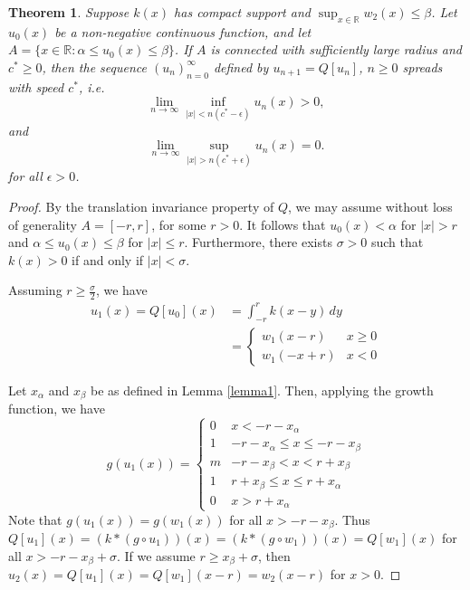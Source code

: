\documentclass[11pt]{article}
\newtheorem{thm}{Theorem}
\theoremstyle{definition}
\numberwithin{equation}{section}
\numberwithin{thm}{section}
\renewcommand{\a}{\alpha}
\renewcommand{\b}{\beta}
\begin{document}
\begin{thm} Suppose $k(x)$ has compact support and $\sup_{x\in\mathbb R}w_2(x)\leq \b$. Let $u_0(x)$ be a non-negative continuous function, and let $A=\{x\in\mathbb R:\a\leq u_0(x)\leq \b\}$. If $A$ is connected with sufficiently large radius and $c^* \geq 0$, then the sequence $(u_n)_{n=0}^{\infty}$ defined by $u_{n+1}=Q[u_n]$, $n\geq 0$ spreads with speed $c^*$, i.e.
\begin{equation}
\lim_{n\to\infty}\inf_{|x|<n(c^*-\epsilon)}u_{n}(x)>0,
\end{equation}
and 
\begin{equation}
\lim_{n\to\infty}\sup_{|x|>n(c^*+\epsilon)}u_n(x)=0.
\end{equation}
for all $\epsilon>0$.
\end{thm}

\begin{proof}
By the translation invariance property of $Q$, we may assume without loss of generality $A=[-r,r]$, for some $r>0$. It follows that $u_0(x)<\a$ for $|x|>r$ and $\a\leq u_0(x)\leq\b$ for $|x| \leq r$. Furthermore, there exists $\sigma>0$ such that $k(x)>0$ if and only if $|x|<\sigma$.

Assuming $r \geq \frac{\sigma}{2}$, we have
\begin{equation} \begin{aligned}
u_1(x) = Q[u_0](x) &= \int_{-r}^{r} k(x-y) \, dy \\
&= \begin{cases}
w_1(x-r) & x \geq 0 \\
w_1(-x+r) & x< 0
\end{cases}
\end{aligned}  \end{equation}

Let $x_\a$ and $x_\b$ be as defined in Lemma \ref{lemma1}. Then, applying the growth function, we have
\begin{equation} g(u_1(x)) = \begin{cases}
0 & x<-r-x_\a \\
1 & -r-x_\a \leq x \leq -r-x_\b \\
m & -r-x_\b < x < r+x_\b \\
1 & r+x_\b \leq x \leq r+x_\a \\
0 & x > r+x_\a
\end{cases}
\end{equation}
Note that $g(u_1(x))=g(w_1(x))$ for all $x >-r-x_\b$. Thus $Q[u_1](x)=(k*(g\circ u_1))(x)=(k*(g\circ w_1))(x)=Q[w_1](x)$ for all $x>-r-x_\b+\sigma$. If we assume $r \geq x_\b+\sigma$, then $u_2(x)=Q[u_1](x)=Q[w_1](x-r)=w_2(x-r)$ for $x>0$. 


\end{proof}
\end{document}
